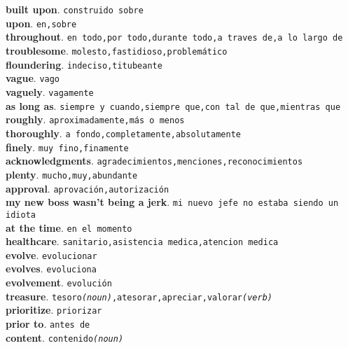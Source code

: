 \documentclass[twocolumn]{article}
\begin{document}
	\textsf{\textbf{built upon}}. \texttt{construido sobre}\\
	\textsf{\textbf{upon}}. \texttt{en,sobre}\\
	\textsf{\textbf{throughout}}. \texttt{en todo,por todo,durante todo,a traves de,a lo largo de}\\
	\textsf{\textbf{troublesome}}. \texttt{molesto,fastidioso,problem\'atico}\\
	\textsf{\textbf{floundering}}. \texttt{indeciso,titubeante}\\
	\textsf{\textbf{vague}}. \texttt{vago}\\
	\textsf{\textbf{vaguely}}. \texttt{vagamente}\\
	\textsf{\textbf{as long as}}. \texttt{siempre y cuando,siempre que,con tal de que,mientras que}\\
	\textsf{\textbf{roughly}}. \texttt{aproximadamente,m\'as o menos}\\
	\textsf{\textbf{thoroughly}}. \texttt{a fondo,completamente,absolutamente}\\
	\textsf{\textbf{finely}}. \texttt{muy fino,finamente}\\
	\textsf{\textbf{acknowledgments}}. \texttt{agradecimientos,menciones,reconocimientos}\\
	\textsf{\textbf{plenty}}. \texttt{mucho,muy,abundante}\\
	\textsf{\textbf{approval}}. \texttt{aprovaci\'on,autorizaci\'on}\\
	\textsf{\textbf{my new boss wasn't being a jerk}}. \texttt{mi nuevo jefe no estaba siendo un idiota}\\
	\textsf{\textbf{at the time}}. \texttt{en el momento}\\
	\textsf{\textbf{healthcare}}. \texttt{sanitario,asistencia medica,atencion medica}\\
	\textsf{\textbf{evolve}}. \texttt{evolucionar}\\
	\textsf{\textbf{evolves}}. \texttt{evoluciona}\\
	\textsf{\textbf{evolvement}}. \texttt{evoluci\'on}\\
    \textsf{\textbf{treasure}}. \texttt{tesoro{\scriptsize \textsl{(noun)}},atesorar,apreciar,valorar{\scriptsize \textsl{(verb)}}}\\
	\textsf{\textbf{prioritize}}. \texttt{priorizar}\\
	\textsf{\textbf{prior to}}. \texttt{antes de}\\
	\textsf{\textbf{content}}. \texttt{contenido{\scriptsize \textsl{(noun)}}}\\
\end{document}
